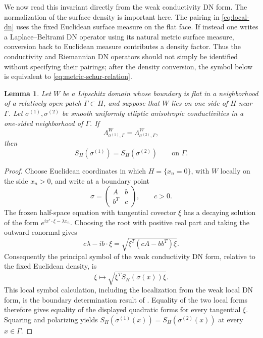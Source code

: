\documentclass[10pt,a4paper]{amsart}
\newtheorem{lemma}[theorem]{Lemma}
\newcommand{\DN}{\Lambda}
\begin{document}
We now read this invariant directly from the weak conductivity DN form.  The
normalization of the surface density is important here.  The pairing in
\eqref{eq:local-dn} uses the fixed Euclidean surface measure on the flat face.
If instead one writes a Laplace--Beltrami DN operator using its natural metric
surface measure, conversion back to Euclidean measure contributes a density
factor.  Thus the conductivity and Riemannian DN operators should not simply be
identified without specifying their pairings; after the density conversion,
the symbol below is equivalent to \eqref{eq:metric-schur-relation}.

\begin{lemma}
\label{lem:face-data-from-local-dn}
Let \(W\) be a Lipschitz domain whose boundary is flat in a neighborhood of a
relatively open patch \(\Gamma\subset H\), and suppose that \(W\) lies on one
side of \(H\) near \(\Gamma\).  Let \(\sigma^{(1)},\sigma^{(2)}\) be smooth
uniformly elliptic anisotropic conductivities in a one-sided neighborhood of
\(\Gamma\).  If
\begin{equation}
  \DN^W_{\sigma^{(1)},\Gamma}=\DN^W_{\sigma^{(2)},\Gamma},
\end{equation}
then
\begin{equation}
  S_H(\sigma^{(1)})=S_H(\sigma^{(2)})
  \qquad\text{on }\Gamma .
  \label{eq:face-data-from-local-dn}
\end{equation}
\end{lemma}

\begin{proof}
Choose Euclidean coordinates in which \(H=\{x_n=0\}\), with \(W\) locally on
the side \(x_n>0\), and write at a boundary point
\begin{equation}
  \sigma=
  \begin{pmatrix}
    A&b\\ b^T&c
  \end{pmatrix},
  \qquad c>0.
\end{equation}
The frozen half-space equation with tangential covector \(\xi\) has a decaying
solution of the form
\(e^{ix'\cdot\xi-\lambda x_n}\).  Choosing the root with positive real part and
taking the outward conormal gives
\begin{equation}
  c\lambda-i b\cdot\xi
  =\sqrt{\xi^T(cA-bb^T)\xi}.
  \label{eq:weak-dn-principal-symbol}
\end{equation}
Consequently the principal symbol of the weak conductivity DN form, relative
to the fixed Euclidean density, is
\begin{equation}
  \xi\longmapsto\sqrt{\xi^T S_H(\sigma(x))\xi}.
\end{equation}
This local symbol calculation, including the localization from the weak local
DN form, is the boundary determination result of \cite{KangYun2003}.  Equality
of the two local forms therefore gives equality of the displayed quadratic
forms for every tangential \(\xi\).  Squaring and polarizing yields
\(S_H(\sigma^{(1)}(x))=S_H(\sigma^{(2)}(x))\) at every \(x\in\Gamma\).
\end{proof}
\end{document}

